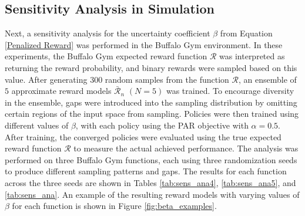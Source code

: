 \documentclass[./dissertation.tex]{subfiles}
\begin{document}
\subsection{Sensitivity Analysis in Simulation}
\label{sec:sens_ana}
Next, a sensitivity analysis for the uncertainty coefficient $\beta$ from Equation \ref{Penalized Reward} was performed in the Buffalo Gym environment. In these experiments, the Buffalo Gym expected reward function $\mathcal{R}$ was interpreted as returning the reward probability, and binary rewards were sampled based on this value. After generating $300$ random samples from the function $\mathcal{R}$, an ensemble of $5$ approximate reward models $\bar{\mathcal{R}}_n$ $(N=5)$ was trained. To encourage diversity in the ensemble, gaps were introduced into the sampling distribution by omitting certain regions of the input space from sampling. Policies were then trained using different values of $\beta$, with each policy using the PAR objective with $\alpha=0.5$. After training, the converged policies were evaluated using the true expected reward function $\mathcal{R}$ to measure the actual achieved performance. The analysis was performed on three Buffalo Gym functions, each using three randomization seeds to produce different sampling patterns and gaps. The results for each function across the three seeds are shown in Tables \ref{tab:sens_ana4}, \ref{tab:sens_ana5}, and \ref{tab:sens_ana}. An example of the resulting reward models with varying values of $\beta$ for each function is shown in Figure \ref{fig:beta_examples}. 
\end{document}
